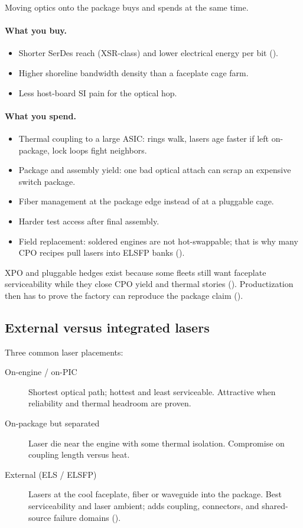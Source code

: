 Moving optics onto the package buys and spends at the same time.

\paragraph{What you buy.}
\begin{itemize}
\item Shorter SerDes reach (XSR-class) and lower electrical energy per bit
      ().
\item Higher shoreline bandwidth density than a faceplate cage farm.
\item Less host-board SI pain for the optical hop.
\end{itemize}

\paragraph{What you spend.}
\begin{itemize}
\item Thermal coupling to a large ASIC: rings walk, lasers age faster if
      left on-package, lock loops fight neighbors.
\item Package and assembly yield: one bad optical attach can scrap an
      expensive switch package.
\item Fiber management at the package edge instead of at a pluggable cage.
\item Harder test access after final assembly.
\item Field replacement: soldered engines are not hot-swappable; that is why
      many CPO recipes pull lasers into ELSFP banks ().
\end{itemize}

XPO and pluggable hedges exist because some fleets still want faceplate
serviceability while they close CPO yield and thermal stories
(). Productization then has to prove the factory
can reproduce the package claim ().

\subsection{External versus integrated lasers}
\label{sec:pkg-laser-place}

Three common laser placements:

\begin{description}
\item[On-engine / on-PIC] Shortest optical path; hottest and least
      serviceable. Attractive when reliability and thermal headroom are
      proven.
\item[On-package but separated] Laser die near the engine with some
      thermal isolation. Compromise on coupling length versus heat.
\item[External (ELS / ELSFP)] Lasers at the cool faceplate, fiber or
      waveguide into the package. Best serviceability and laser ambient;
      adds coupling, connectors, and shared-source failure domains
      ().
\end{description}

